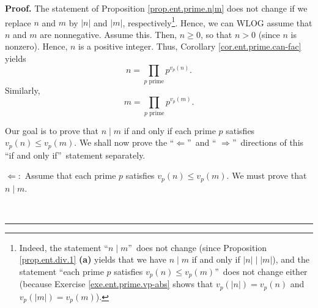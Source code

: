 \documentclass[numbers=enddot,12pt,final,onecolumn,notitlepage]{scrartcl}%
\numberwithin{exer}{subsection}
\theoremstyle{definition}
\newenvironment{proof}[1][Proof]{\noindent\textbf{#1.} }{\ \rule{0.5em}{0.5em}}
\let\prodnonlimits\prod
\renewcommand{\prod}{\prodnonlimits\limits}
\begin{document}
\begin{proof}
The statement of Proposition \ref{prop.ent.prime.n|m} does not change if we
replace $n$ and $m$ by $\left\vert n\right\vert $ and $\left\vert m\right\vert
$, respectively\footnote{Indeed, the statement \textquotedblleft$n\mid
m$\textquotedblright\ does not change (since Proposition \ref{prop.ent.div.1}
\textbf{(a)} yields that we have $n\mid m$ if and only if $\left\vert
n\right\vert \mid\left\vert m\right\vert $), and the statement
\textquotedblleft each prime $p$ satisfies $v_{p}\left(  n\right)  \leq
v_{p}\left(  m\right)  $\textquotedblright\ does not change either (because
Exercise \ref{exe.ent.prime.vp-abs} shows that $v_{p}\left(  \left\vert
n\right\vert \right)  =v_{p}\left(  n\right)  $ and $v_{p}\left(  \left\vert
m\right\vert \right)  =v_{p}\left(  m\right)  $).}. Hence, we can WLOG assume
that $n$ and $m$ are nonnegative. Assume this. Then, $n\geq0$, so that $n>0$
(since $n$ is nonzero). Hence, $n$ is a positive integer. Thus, Corollary
\ref{cor.ent.prime.can-fac} yields%
\begin{equation}
n=\prod_{p\text{ prime}}p^{v_{p}\left(  n\right)  }.
\label{pf.prop.ent.prime.n|m.n=}%
\end{equation}
Similarly,%
\begin{equation}
m=\prod_{p\text{ prime}}p^{v_{p}\left(  m\right)  }.
\label{pf.prop.ent.prime.n|m.m=}%
\end{equation}


Our goal is to prove that $n\mid m$ if and only if each prime $p$ satisfies
$v_{p}\left(  n\right)  \leq v_{p}\left(  m\right)  $. We shall now prove the
\textquotedblleft$\Longleftarrow$\textquotedblright\ and \textquotedblleft%
$\Longrightarrow$\textquotedblright\ directions of this \textquotedblleft if
and only if\textquotedblright\ statement separately.

$\Longleftarrow:$ Assume that each prime $p$ satisfies $v_{p}\left(  n\right)
\leq v_{p}\left(  m\right)  $. We must prove that $n\mid m$.


\end{proof}
\end{document}
